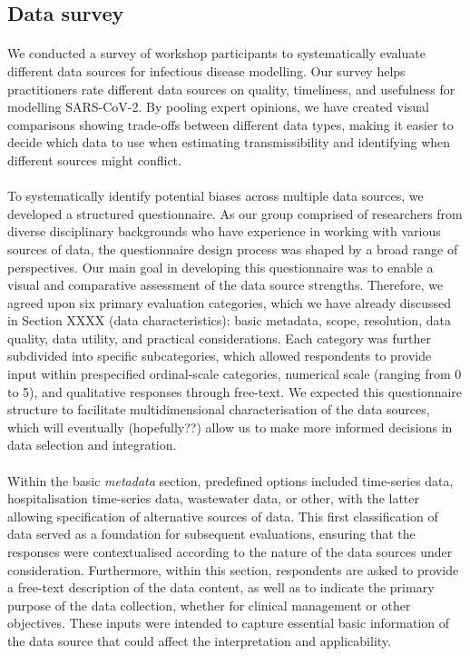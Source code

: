 \documentclass{article}
\begin{document}
\subsection{Data survey}

\paragraph{}We conducted a survey of workshop participants to systematically evaluate different data sources for infectious disease modelling.
Our survey helps practitioners rate different data sources on quality, timeliness, and usefulness for modelling SARS-CoV-2. By pooling expert opinions, we have created visual comparisons showing trade-offs between different data types, making it easier to decide which data to use when estimating transmissibility and identifying when different sources might conflict.

\paragraph{}To systematically identify potential biases across multiple data sources, we developed a structured questionnaire. As our group comprised of researchers from diverse disciplinary backgrounds who have experience in working with various sources of data, the questionnaire design process was shaped by a broad range of perspectives. Our main goal in developing this questionnaire was to enable a visual and comparative assessment of the data source strengths. Therefore, we agreed upon six primary evaluation categories, which we have already discussed in Section XXXX (data characteristics): basic metadata, scope, resolution, data quality, data utility, and practical considerations. Each category was further subdivided into specific subcategories, which allowed respondents to provide input within prespecified ordinal-scale categories, numerical scale (ranging from 0 to 5), and qualitative responses through free-text. We expected this questionnaire structure to facilitate multidimensional characterisation of the data sources, which will eventually (hopefully??)  allow us to make more informed decisions in data selection and integration. 

\paragraph{}Within the basic \textit{metadata} section, predefined options included time-series data, hospitalisation time-series data, wastewater data, or other, with the latter allowing specification of alternative sources of data. This first classification of data served as a foundation for subsequent evaluations, ensuring that the responses were contextualised according to the nature of the data sources under consideration. Furthermore, within this section, respondents are asked to provide a free-text description of the data content, as well as to indicate the primary purpose of the data collection, whether for clinical management or other objectives. These inputs were intended to capture essential basic information of the data source that could affect the interpretation and applicability. 
\end{document}
